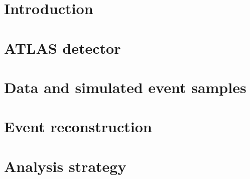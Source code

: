 \documentclass[PAPER, atlasdraft=false, cernpreprint, UKenglish]{atlasdoc}
\begin{document}
\maketitle

\tableofcontents


\section{Introduction}


\section{ATLAS detector}
\label{sec:detector}



\section{Data and simulated event samples}
\label{sec:DataAndMC}


\section{Event reconstruction}
\label{sec:Reco}


\section{Analysis strategy}
\label{sec:Analysis}


\end{document}
